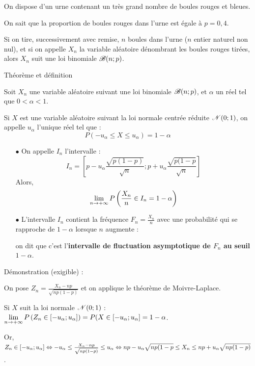 \begin{spacing}{1.2}
On dispose d'un urne contenant un très grand nombre de boules rouges et bleues.

On sait que la proportion de boules rouges dans l'urne est égale à $p=0,4$.

Si on tire, successivement avec remise, $n$ boules dans l'urne ($n$ entier naturel non nul), et si on appelle $X_n$ la variable aléatoire dénombrant les boules rouges tirées, alors $X_n$ suit une loi binomiale $\mathscr{B}(n;p)$.

\medskip

\begin{bclogo}[couleur = gray!30 , arrondi = 0.1 ,logo = \bclampe , barre = snake , tailleOndu = 1.5]{Théorème et définition}

Soit $X_n$ une variable aléatoire suivant une loi binomiale $\mathscr{B}(n;p)$, et $\alpha$ un réel tel que $0<\alpha<1$.

Si $X$ est une variable aléatoire suivant la loi normale centrée réduite $\mathscr{N}(0;1)$, on appelle $u_{\alpha}$ l'unique réel tel que :
\[P(-u_{\alpha}\leq X\leq u_{\alpha})=1-\alpha\]
\begin{itemize}
\item[$\bullet$] On appelle $I_n$ l'intervalle :
\[I_n=\left[p-u_{\alpha}\frac{\sqrt{p(1-p)}}{\sqrt{n}};p+u_{\alpha}\frac{\sqrt{p(1-p}}{\sqrt{n}}\right]\]
Alors,
\[\limn P\left(\frac{X_n}{n}\in I_n=1-\alpha\right)\]

\item[$\bullet$] L'intervalle $I_n$ contient la fréquence $F_n=\frac{X_n}{n}$ avec une probabilité qui se rapproche de $1-\alpha$ lorsque $n$ augmente : 

on dit que c'est l'\textbf{intervalle de fluctuation asymptotique de $F_n$ au seuil $1-\alpha$}.
\end{itemize}
\end{bclogo}

\bigskip

\begin{bclogo}[couleur = yellow!30 , arrondi = 0.1 ,logo = \bclampe , barre = snake , tailleOndu = 1.5]{Démonstration (exigible) :}

On pose $Z_n=\frac{X_n-np}{\sqrt{np(1-p)}}$ et on applique le théorème de Moivre-Laplace.

Si $X$ suit la loi normale $\mathscr{N}(0;1)$ : $\limn P\left(Z_n\in [-u_{\alpha};u_{\alpha}]\right)=P(X\in [-u_{\alpha};u_{\alpha}]=1-\alpha$.

Or, $Z_n\in [-u_{\alpha};u_{\alpha}] \Leftrightarrow -u_{\alpha}\leq \frac{X_n-np}{\sqrt{np(1-p)}}\leq u_{\alpha} \Leftrightarrow np-u_{\alpha}\sqrt{np(1-p}\leq X_n \leq np+u_{\alpha}\sqrt{np(1-p)}$.


\end{bclogo}
\end{spacing}
